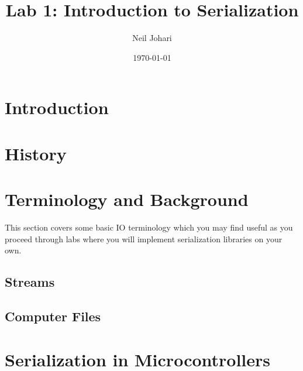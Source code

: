 \documentclass[12pt, letterpaper]{article}
\title{Lab 1: Introduction to Serialization}
\author{Neil Johari}
\date{\today}
\begin{document}
\maketitle

\section{Introduction}


\section{History}


\section{Terminology and Background}
This section covers some basic IO terminology which you may find useful as you proceed through labs where you will implement serialization libraries on your own.

\subsection{Streams}


\subsection{Computer Files}


\section{Serialization in Microcontrollers}




\end{document}
